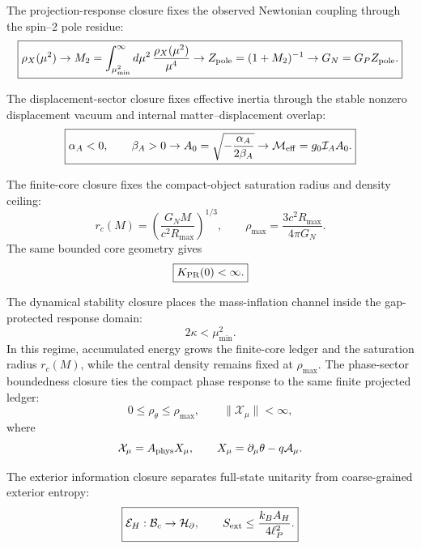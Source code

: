 \documentclass[11pt]{article}
\begin{document}
The projection-response closure fixes the observed Newtonian coupling through
the spin--2 pole residue:
\begin{equation}
\boxed{
\rho_X(\mu^2)
\rightarrow
M_2
=
\int_{\mu_{\min}^2}^{\infty}
d\mu^2\,
\frac{\rho_X(\mu^2)}{\mu^4}
\rightarrow
Z_{\rm pole}
=
(1+M_2)^{-1}
\rightarrow
G_N
=
G_PZ_{\rm pole}.
}
\end{equation}

The displacement-sector closure fixes effective inertia through the stable
nonzero displacement vacuum and internal matter--displacement overlap:
\begin{equation}
\boxed{
\alpha_A<0,
\qquad
\beta_A>0
\rightarrow
A_0
=
\sqrt{-\frac{\alpha_A}{2\beta_A}}
\rightarrow
\mathcal M_{\rm eff}
=
g_0\mathcal I_AA_0.
}
\end{equation}

The finite-core closure fixes the compact-object saturation radius and density
ceiling:
\begin{equation}
\boxed{
r_c(M)
=
\left(
\frac{G_NM}{c^2R_{\max}}
\right)^{1/3},
\qquad
\rho_{\max}
=
\frac{3c^2R_{\max}}{4\pi G_N}.
}
\end{equation}
The same bounded core geometry gives
\begin{equation}
\boxed{
K_{\rm PR}(0)<\infty.
}
\end{equation}

The dynamical stability closure places the mass-inflation channel inside the
gap-protected response domain:
\begin{equation}
\boxed{
2\kappa<\mu_{\min}^2.
}
\end{equation}
In this regime, accumulated energy grows the finite-core ledger and the
saturation radius \(r_c(M)\), while the central density remains fixed at
\(\rho_{\max}\). The phase-sector boundedness closure ties the compact phase response to the
same finite projected ledger:
\begin{equation}
\boxed{
0\leq\rho_\theta\leq\rho_{\max},
\qquad
\|\mathcal X_\mu\|<\infty,
}
\end{equation}
where
\begin{equation}
\mathcal X_\mu
=
A_{\rm phys}X_\mu,
\qquad
X_\mu
=
\partial_\mu\theta-q\mathcal A_\mu.
\end{equation}

The exterior information closure separates full-state unitarity from
coarse-grained exterior entropy:
\begin{equation}
\boxed{
\mathcal E_H:\mathcal B_c\rightarrow\mathcal H_{\partial},
\qquad
S_{\rm ext}
\leq
\frac{k_BA_H}{4\ell_P^2}.
}
\end{equation}
\end{document}
